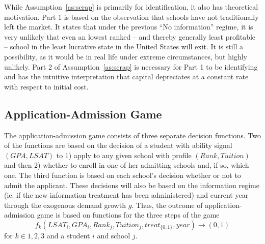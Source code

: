 \documentclass[12pt]{article}
\theoremstyle{definition}
\begin{document}
While Assumption~\ref{as:scrap} is primarily for identification, it also has theoretical motivation. Part 1 is based on the observation that schools have not traditionally left the market. It states that under the previous ``No information'' regime, it is very unlikely that even an lowest ranked -- and thereby generally least profitable -- school in the least lucrative state in the United States will exit. It is still a possibility, as it would be in real life under extreme circumstances, but highly unlikely. Part 2 of Assumption~\ref{as:scrap} is necessary for Part 1 to be identifying and has the intuitive interpretation that capital depreciates at a constant rate with respect to initial cost.




\subsection{Application-Admission Game}
\label{sec:app_admit_strategy}
The application-admission game consists of three separate decision functions. Two of the functions are based on the decision of a student with ability signal $(GPA, LSAT)$ to 1) apply to any given school with profile $(Rank, Tuition)$ and then 2) whether to enroll in one of her admitting schools and, if so, which one. The third function is based on each school's decision whether or not to admit the applicant. These decisions will also be based on the information regime (ie. if the new information treatment has been administered) and current year through the exogenous demand growth $g$. Thus, the outcome of application-admission game is based on functions for the three steps of the game
\begin{equation}
  f_k(LSAT_i, GPA_i, Rank_j, Tuition_j, treat_{\{0, 1\}}, year) \rightarrow 
  (0, 1)
  \label{eq:fs_appadmit_stages}
\end{equation}
for $k \in {1, 2, 3}$ and a student $i$ and school $j$.
\end{document}

